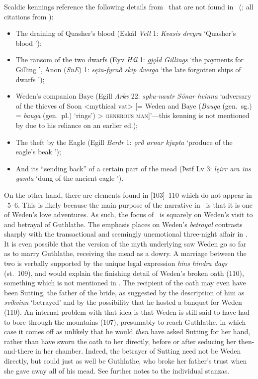 Scaldic kennings reference the following details from \Skaldskaparmal\ that are not found in \Havamal\ (\cite[427--430]{Meissner1921}; all citations from \Skp):
\begin{itemize}
\item The draining of Quasher’s blood (Eskál \emph{Vell} 1: \emph{Kvasis dreyra} ‘Quasher’s blood ’);
\item The ransom of the two dwarfs (Eyv \emph{Hál} 1: \emph{gjǫld Gillings} ‘the payments for Gilling ’, Anon (\emph{SnE}) 1: \emph{sęin-fyrnð skip dverga} ‘the late forgotten ships of dwarfs ’);
\item Weden’s companion Baye (Egill \emph{Arkv} 22: \emph{sǫku-nautr Sónar hvinna} ‘adversary of the thieves of Soon <mythical vat> [= Weden and Baye (\emph{Bauga} (gen.~sg.) = \emph{bauga} (gen.~pl.) ‘rings’) > \textsc{generous man}]’---this kenning is not mentioned by \citeauthor{Meissner1921} due to his reliance on an earlier ed.);
\item The theft by the Eagle (Egill \emph{Berdr} 1: \emph{ǫrð arnar kjapta} ‘produce of the eagle’s beak ’);
\item And its “sending back” of a certain part of the mead (Þstf Lv 3: \emph{lęirr ara ins gamla} ‘dung of the ancient eagle ’).
\end{itemize}

On the other hand, there are elements found in [103]--110 which do not appear in \Skaldskaparmal\ 5--6.  This is likely because the main purpose of the narrative in \Havamal\ is that it is one of Weden’s love adventures.  As such, the focus of \Havamal\ is squarely on Weden’s visit to and betrayal of Guthlathe.  The emphasis  places on Weden’s \emph{betrayal} contrasts sharply with the transactional and seemingly unemotional three-night affair in \Skaldskaparmal.  It is even possible that the version of the myth underlying  saw Weden go so far as to marry Guthlathe, receiving the mead as a dowry.
A marriage between the two is verbally supported by the unique legal expression \emph{hins hindra dags} (st.~109), and would explain the finishing detail of Weden’s broken oath (110), something which is not mentioned in \Skaldskaparmal.  The recipient of the oath may even have been Sutting, the father of the bride, as suggested by the description of him as \emph{svikvinn} ‘betrayed’ and by the possibility that he hosted a banquet for Weden (110).
An internal problem with that idea is that Weden is still said to have had to bore through the mountains (107), presumably to reach Guthlathe, in which case it comes off as unlikely that he would \emph{then} have asked Sutting for her hand, rather than have sworn the oath to her directly, before or after seducing her then-and-there in her chamber.  Indeed, the betrayer of Sutting need not be Weden directly, but could just as well be Guthlathe, who broke her father’s trust when she gave away all of his mead.  See further notes to the individual stanzas.

